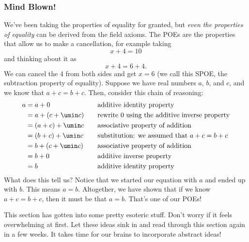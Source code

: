 \subsubsection{Mind Blown!}
We've been taking the properties of equality for granted, but \textit{even the properties of equality} can be derived from the field axioms. The POEs are the properties that allow us to make a cancellation, for example taking \[x + 4 = 10\] and thinking about it as \[x + 4 = 6 + 4.\] We can cancel the 4 from both sides and get $x = 6$ (we call this SPOE, the subtraction property of equality). Suppose we have real numbers $a$, $b$, and $c$, and we know that $a+c = b+c$. Then, consider this chain of reasoning:
\[\begin{aligned}
a &= a + 0
&& \quad\text{additive identity property}
\\
&= a + (c + \umin c)
&& \quad\text{rewrite 0 using the additive inverse property}
\\
&= (a + c) + \umin c
&& \quad\text{associative property of addition}
\\
&= (b + c) + \umin c
&& \quad\text{substitution: we assumed that $a+c = b+c$}
\\
&= b + (c + \umin c)
&& \quad\text{associative property of addition}
\\
&= b + 0
&& \quad\text{additive inverse property}
\\
&= b
&& \quad\text{additive identity property}
\end{aligned}\]
What does this tell us? Notice that we started our equation with $a$ and ended up with $b$. This means $a=b$. Altogether, we have shown that if we know $a+c = b+c$, then it must be that $a = b$. That's one of our POEs!

This section has gotten into some pretty esoteric stuff. Don't worry if it feels overwhelming at first. Let these ideas sink in and read through this section again in a few weeks. It takes time for our brains to incorporate abstract ideas!

